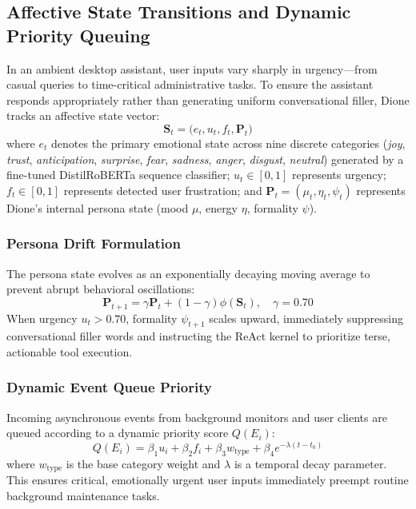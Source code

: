 \documentclass[conference,a4paper]{IEEEtran}
\begin{document}
\subsection{Affective State Transitions and Dynamic Priority Queuing}
In an ambient desktop assistant, user inputs vary sharply in urgency---from casual queries to time-critical administrative tasks. To ensure the assistant responds appropriately rather than generating uniform conversational filler, Dione tracks an affective state vector:
\begin{equation}
\mathbf{S}_t = \big(e_t, u_t, f_t, \mathbf{P}_t\big)
\end{equation}
where $e_t$ denotes the primary emotional state across nine discrete categories (\textit{joy}, \textit{trust}, \textit{anticipation}, \textit{surprise}, \textit{fear}, \textit{sadness}, \textit{anger}, \textit{disgust}, \textit{neutral}) generated by a fine-tuned DistilRoBERTa sequence classifier; $u_t \in [0, 1]$ represents urgency; $f_t \in [0, 1]$ represents detected user frustration; and $\mathbf{P}_t = (\mu_t, \eta_t, \psi_t)$ represents Dione's internal persona state (mood $\mu$, energy $\eta$, formality $\psi$).

\subsubsection{Persona Drift Formulation}
The persona state evolves as an exponentially decaying moving average to prevent abrupt behavioral oscillations:
\begin{equation}
\mathbf{P}_{t+1} = \gamma \mathbf{P}_t + (1 - \gamma) \phi(\mathbf{S}_t), \quad \gamma = 0.70
\end{equation}
When urgency $u_t > 0.70$, formality $\psi_{t+1}$ scales upward, immediately suppressing conversational filler words and instructing the ReAct kernel to prioritize terse, actionable tool execution.

\subsubsection{Dynamic Event Queue Priority}
Incoming asynchronous events from background monitors and user clients are queued according to a dynamic priority score $Q(E_i)$:
\begin{equation}
Q(E_i) = \beta_1 u_i + \beta_2 f_i + \beta_3 w_{\text{type}} + \beta_4 e^{-\lambda (t - t_0)}
\end{equation}
where $w_{\text{type}}$ is the base category weight and $\lambda$ is a temporal decay parameter. This ensures critical, emotionally urgent user inputs immediately preempt routine background maintenance tasks.
\end{document}
